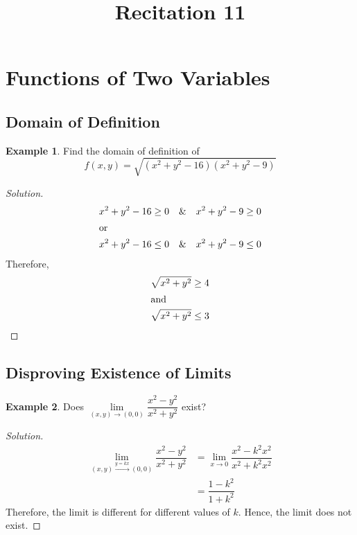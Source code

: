\documentclass[fleqn, 12pt]{article}
\title{Recitation 11}
\author{}
\date{\formatdate{7}{1}{2015}}
\theoremstyle{definition}
\newtheorem{example}{Example}
\theoremstyle{theorem}
\newenvironment{solution}
{\begin{proof}[Solution]\let\qed\relax}
	{\end{proof}}
\begin{document}
\maketitle

\tableofcontents

\newpage
\section{Functions of Two Variables}

\subsection{Domain of Definition}

\begin{example}
	Find the domain of definition of 
	\begin{equation*}
		f(x,y) = \sqrt{(x^2 + y^2 - 16) (x^2 + y^2 - 9)}
	\end{equation*}
\end{example}

\begin{solution}
	\begin{align*}
		x^2 + y^2 - 16 &\geq 0 &\&&& x^2 + y^2 - 9 &\geq 0\\
		\intertext{or}
		x^2 + y^2 - 16 &\leq 0 &\&&& x^2 + y^2 - 9 &\leq 0
	\end{align*}
	Therefore,
	\begin{align*}
		\sqrt{x^2 + y^2} &\geq 4\\
		\intertext{and}
		\sqrt{x^2 + y^2} &\leq 3
	\end{align*}
\end{solution}

\subsection{Disproving Existence of Limits}

\begin{example}
	Does $\lim\limits_{(x,y) \to (0,0)} \dfrac{x^2 - y^2}{x^2 + y^2}$ exist?
\end{example}

\begin{solution}
	\begin{align*}
		\lim\limits_{(x,y) \stackrel{y = kx}{\to} (0,0)} \dfrac{x^2 - y^2}{x^2 + y^2} &= \lim\limits_{x \to 0} \dfrac{x^2 - k^2 x^2}{x^2 + k^2 x^2}\\
		&= \dfrac{1 - k^2}{1 + k^2}
	\end{align*}
	Therefore, the limit is different for different values of $k$. Hence, the limit does not exist.
\end{solution}
\end{document}
